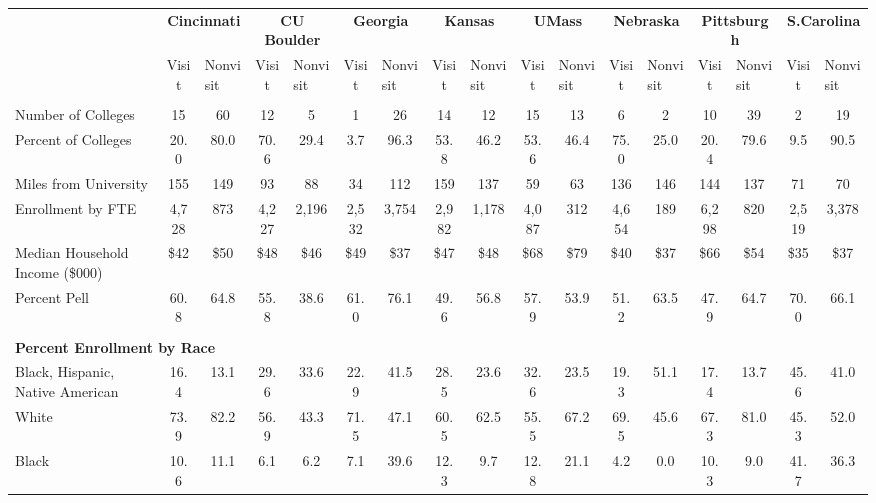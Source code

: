 \begin{tabular*}{\linewidth}{@{\extracolsep{\fill} } lcccccccccccccccc}%
&\multicolumn{2}{c}{\bfseries Cincinnati}&\multicolumn{2}{c}{\bfseries CU Boulder}&\multicolumn{2}{c}{\bfseries Georgia}&\multicolumn{2}{c}{\bfseries Kansas}&\multicolumn{2}{c}{\bfseries UMass}&\multicolumn{2}{c}{\bfseries Nebraska}&\multicolumn{2}{c}{\bfseries Pittsburgh}&\multicolumn{2}{c}{\bfseries S.Carolina}\\%
&Visit&\multicolumn{1}{l}{Nonvisit}&Visit&\multicolumn{1}{l}{Nonvisit}&Visit&\multicolumn{1}{l}{Nonvisit}&Visit&\multicolumn{1}{l}{Nonvisit}&Visit&\multicolumn{1}{l}{Nonvisit}&Visit&\multicolumn{1}{l}{Nonvisit}&Visit&\multicolumn{1}{l}{Nonvisit}&Visit&\multicolumn{1}{l}{Nonvisit}\\%
\hline%
&&&&&&&&&&&&&&&&\\%
\hspace{0cm}Number of Colleges&15&60&12&5&1&26&14&12&15&13&6&2&10&39&2&19\\%
Percent of Colleges&20.0&80.0&70.6&29.4&3.7&96.3&53.8&46.2&53.6&46.4&75.0&25.0&20.4&79.6&9.5&90.5\\%
\hspace{0cm}Miles from University&155&149&93&88&34&112&159&137&59&63&136&146&144&137&71&70\\%
\hspace{0cm}Enrollment by FTE&4,728&873&4,227&2,196&2,532&3,754&2,982&1,178&4,087&312&4,654&189&6,298&820&2,519&3,378\\%
\hspace{0cm}Median Household Income (\$000)&\$42&\$50&\$48&\$46&\$49&\$37&\$47&\$48&\$68&\$79&\$40&\$37&\$66&\$54&\$35&\$37\\%
\hspace{0cm}Percent Pell&60.8&64.8&55.8&38.6&61.0&76.1&49.6&56.8&57.9&53.9&51.2&63.5&47.9&64.7&70.0&66.1\\%
&&&&&&&&&&&&&&&&\\%
\multicolumn{17}{l}{\bfseries Percent Enrollment by Race}\\%
\hspace{0.2cm}Black, Hispanic, Native American&16.4&13.1&29.6&33.6&22.9&41.5&28.5&23.6&32.6&23.5&19.3&51.1&17.4&13.7&45.6&41.0\\%
\hspace{0.2cm}White&73.9&82.2&56.9&43.3&71.5&47.1&60.5&62.5&55.5&67.2&69.5&45.6&67.3&81.0&45.3&52.0\\%
\hspace{0.2cm}Black&10.6&11.1&6.1&6.2&7.1&39.6&12.3&9.7&12.8&21.1&4.2&0.0&10.3&9.0&41.7&36.3\\%

\end{tabular*}
